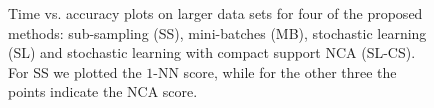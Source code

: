       \begin{figure}
		\centering
		\caption[Time vs. accuracy plots for four of the methods proposed: sub-sampling, mini-batches, stochastic learning and stochastic learning for compact support NCA]{Time vs. accuracy plots on larger data sets for four of the proposed methods: sub-sampling (SS), mini-batches (MB), stochastic learning (SL) and stochastic learning with compact support NCA (SL-CS). For SS we plotted the $1$-NN score, while for the other three the points indicate the NCA score.}
		\label{fig:time-accuracy}
      \end{figure}

